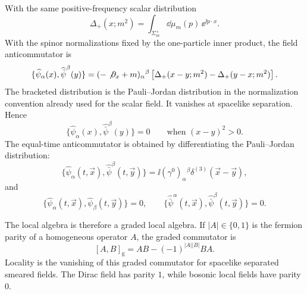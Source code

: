 With the same positive-frequency scalar distribution
\[
  \Delta_+(x;m^2)
  =
  \int_{\Sigma_m^+}\dd\mu_m(p)\,\ee^{\ii p\cdot x}.
\]
With the spinor normalizations fixed by the one-particle inner product, the
field anticommutator is
\[
  \{\widehat\psi_\alpha(x),\widehat{\bar\psi}^{\beta}(y)\}
  =
  (-\not\partial_x+m)_\alpha{}^\beta
  \left[
    \Delta_+(x-y;m^2)-\Delta_+(y-x;m^2)
  \right].
\]
The bracketed distribution is the Pauli--Jordan distribution in the
normalization convention already used for the scalar field. It vanishes at
spacelike separation. Hence
\[
  \{\widehat\psi_\alpha(x),\widehat{\bar\psi}^{\beta}(y)\}=0
  \qquad\text{when }(x-y)^2>0.
\]
The equal-time anticommutator is obtained by differentiating the
Pauli--Jordan distribution:
\[
  \{\widehat\psi_\alpha(t,\vec x),
    \widehat{\bar\psi}^{\beta}(t,\vec y)\}
  =
  \ii(\gamma^0)_\alpha{}^\beta\delta^{(3)}(\vec x-\vec y),
\]
and
\[
  \{\widehat\psi_\alpha(t,\vec x),\widehat\psi_\beta(t,\vec y)\}=0,
  \qquad
  \{\widehat{\bar\psi}^{\alpha}(t,\vec x),
    \widehat{\bar\psi}^{\beta}(t,\vec y)\}=0.
\]

The local algebra is therefore a graded local algebra. If \(|A|\in\{0,1\}\)
is the fermion parity of a homogeneous operator \(A\), the graded commutator is
\[
  [A,B]_{\mathrm g}
  =
  AB-(-1)^{|A||B|}BA .
\]
Locality is the vanishing of this graded commutator for spacelike separated
smeared fields. The Dirac field has parity \(1\), while bosonic local fields
have parity \(0\).


